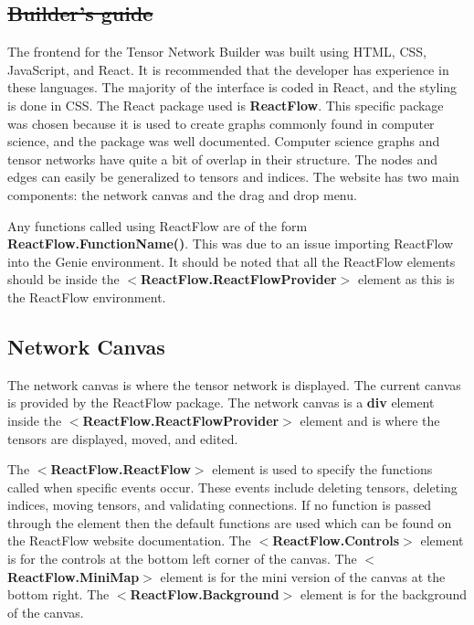 \documentclass{juliacon}
\providecommand{\DIFdeltex}[1]{{\protect\color{red}\sout{#1}}}                      %
\providecommand{\DIFdelend}{} %
\providecommand{\DIFdel}[1]{\texorpdfstring{\DIFdeltex{#1}}{}} %
\begin{document}
\begin{appendix}
\section{\DIFdel{Builder's guide}}
\addtocounter{section}{-1}%
\DIFdelend The frontend for the Tensor Network Builder was built using HTML, CSS, JavaScript, and React. It is recommended that the developer has experience in these languages. The majority of the interface is coded in React, and the styling is done in CSS. The React package used is \textbf{ReactFlow}. This specific package was chosen because it is used to create graphs commonly found in computer science, and the package was well documented. Computer science graphs and tensor networks have quite a bit of overlap in their structure. The nodes and edges can easily be generalized to tensors and indices. The website has two main components: the network canvas and the drag and drop menu.

Any functions called using ReactFlow are of the form \textbf{ReactFlow.FunctionName()}. This was due to an issue importing ReactFlow into the Genie environment. It should be noted that all the ReactFlow elements should be inside the $<$\textbf{ReactFlow.ReactFlowProvider}$>$ element as this is the ReactFlow environment. 

\subsection{Network Canvas}

The network canvas is where the tensor network is displayed. The current canvas is provided by the ReactFlow package. The network canvas is a \textbf{div} element inside the $<$\textbf{ReactFlow.ReactFlowProvider}$>$ element and is where the tensors are displayed, moved, and edited.

The $<$\textbf{ReactFlow.ReactFlow}$>$ element is used to specify the functions called when specific events occur. These events include deleting tensors, deleting indices, moving tensors, and validating connections. If no function is passed through the element then the default functions are used which can be found on the ReactFlow website documentation. The $<$\textbf{ReactFlow.Controls}$>$ element is for the controls at the bottom left corner of the canvas. The $<$\textbf{ReactFlow.MiniMap}$>$ element is for the mini version of the canvas at the bottom right. The $<$\textbf{ReactFlow.Background}$>$ element is for the background of the canvas.



\end{appendix}
\end{document}
